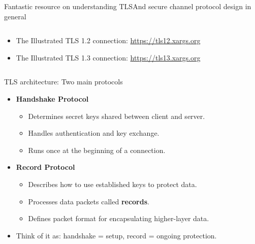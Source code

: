 \documentclass[aspectratio=169, lualatex, handout]{beamer}
\begin{document}
\begin{frame}{Fantastic resource on understanding TLS}{And secure channel protocol design in general}
	\begin{columns}[c]
		\begin{column}{0.5\textwidth}
			\begin{itemize}
				\item The Illustrated TLS 1.2 connection: \url{https://tls12.xargs.org}
				\item The Illustrated TLS 1.3 connection: \url{https://tls13.xargs.org}
			\end{itemize}
		\end{column}
		\begin{column}{0.5\textwidth}
		\end{column}
	\end{columns}
\end{frame}

\begin{frame}{TLS architecture: Two main protocols}
	\begin{itemize}
		\item \textbf{Handshake Protocol}
		      \begin{itemize}
			      \item Determines secret keys shared between client and server.
			      \item Handles authentication and key exchange.
			      \item Runs once at the beginning of a connection.
		      \end{itemize}
		\item \textbf{Record Protocol}
		      \begin{itemize}
			      \item Describes how to use established keys to protect data.
			      \item Processes data packets called \textbf{records}.
			      \item Defines packet format for encapsulating higher-layer data.
		      \end{itemize}
		\item Think of it as: handshake = setup, record = ongoing protection.
	\end{itemize}
\end{frame}
\end{document}

